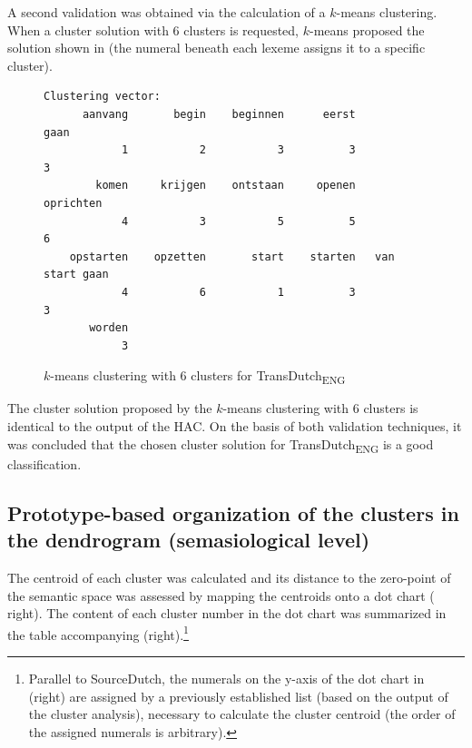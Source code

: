 A second validation was obtained via the calculation of a $k$-means clustering. When a cluster solution with 6 clusters is requested, $k$-means proposed the solution shown in  (the numeral beneath each lexeme assigns it to a specific cluster).

\begin{figure}
\begin{lstlisting}
Clustering vector:
      aanvang       begin    beginnen      eerst             gaan 
            1           2           3          3                3         
        komen     krijgen    ontstaan     openen        oprichten         
            4           3           5          5                6         
    opstarten    opzetten       start    starten   van start gaan         
            4           6           1          3                3         
       worden                                            
            3                                      
\end{lstlisting}
\caption{\label{fig:4:66}$k$-means clustering with 6 clusters for TransDutch\textsubscript{ENG}}
\end{figure}

The cluster solution proposed by the $k$-means clustering with 6 clusters is identical to the output of the HAC. On the basis of both validation techniques, it was concluded that the chosen cluster solution for TransDutch\textsubscript{ENG} is a good classification.

\subsection{Prototype-based organization of the clusters in the dendrogram (semasiological level)}
\label{sec:4.3.2}  
The centroid of each cluster was calculated and its distance to the zero-point of the semantic space was assessed by mapping the centroids onto a dot chart ( right). The content of each cluster number in the dot chart was summarized in the table accompanying  (right).\footnote{Parallel to SourceDutch, the numerals on the y-axis of the dot chart in  (right) are assigned by a previously established list (based on the output of the cluster analysis), necessary to calculate the cluster centroid (the order of the assigned numerals is arbitrary).}

